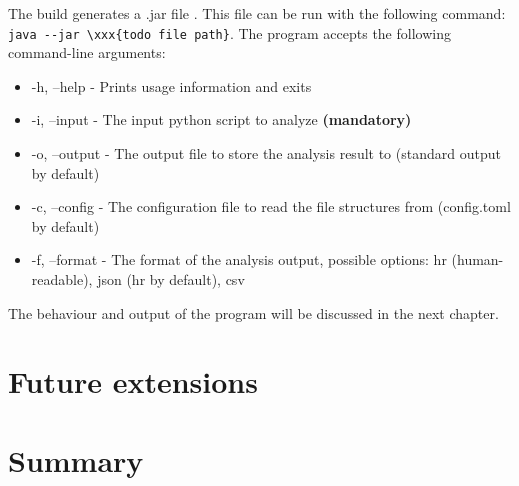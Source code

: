 The build generates a .jar file .
This file can be run with the following command:
\verb|java --jar \xxx{todo file path}|.
The program accepts the following command-line arguments:
\begin{itemize}
    \item -h, --help - Prints usage information and exits
    \item -i, --input - The input python script to analyze \textbf{(mandatory)}
    \item -o, --output - The output file to store the analysis result to (standard output by default)
    \item -c, --config - The configuration file to read the file structures from (config.toml by default)
    \item -f, --format - The format of the analysis output, possible options: hr (human-readable), json (hr by default), csv
\end{itemize}

The behaviour and output of the program will be discussed in the next chapter.

\section{Future extensions}

\section*{Summary}
